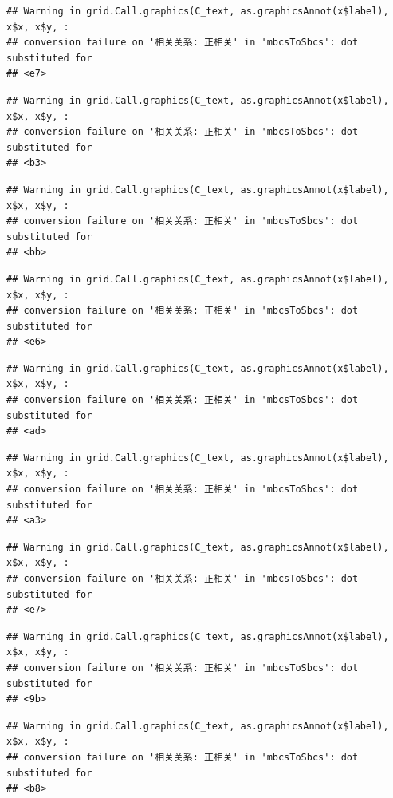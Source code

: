 \documentclass[
]{book}
\begin{document}
\begin{verbatim}
## Warning in grid.Call.graphics(C_text, as.graphicsAnnot(x$label), x$x, x$y, :
## conversion failure on '相关关系: 正相关' in 'mbcsToSbcs': dot substituted for
## <e7>
\end{verbatim}

\begin{verbatim}
## Warning in grid.Call.graphics(C_text, as.graphicsAnnot(x$label), x$x, x$y, :
## conversion failure on '相关关系: 正相关' in 'mbcsToSbcs': dot substituted for
## <b3>
\end{verbatim}

\begin{verbatim}
## Warning in grid.Call.graphics(C_text, as.graphicsAnnot(x$label), x$x, x$y, :
## conversion failure on '相关关系: 正相关' in 'mbcsToSbcs': dot substituted for
## <bb>
\end{verbatim}

\begin{verbatim}
## Warning in grid.Call.graphics(C_text, as.graphicsAnnot(x$label), x$x, x$y, :
## conversion failure on '相关关系: 正相关' in 'mbcsToSbcs': dot substituted for
## <e6>
\end{verbatim}

\begin{verbatim}
## Warning in grid.Call.graphics(C_text, as.graphicsAnnot(x$label), x$x, x$y, :
## conversion failure on '相关关系: 正相关' in 'mbcsToSbcs': dot substituted for
## <ad>
\end{verbatim}

\begin{verbatim}
## Warning in grid.Call.graphics(C_text, as.graphicsAnnot(x$label), x$x, x$y, :
## conversion failure on '相关关系: 正相关' in 'mbcsToSbcs': dot substituted for
## <a3>
\end{verbatim}

\begin{verbatim}
## Warning in grid.Call.graphics(C_text, as.graphicsAnnot(x$label), x$x, x$y, :
## conversion failure on '相关关系: 正相关' in 'mbcsToSbcs': dot substituted for
## <e7>
\end{verbatim}

\begin{verbatim}
## Warning in grid.Call.graphics(C_text, as.graphicsAnnot(x$label), x$x, x$y, :
## conversion failure on '相关关系: 正相关' in 'mbcsToSbcs': dot substituted for
## <9b>
\end{verbatim}

\begin{verbatim}
## Warning in grid.Call.graphics(C_text, as.graphicsAnnot(x$label), x$x, x$y, :
## conversion failure on '相关关系: 正相关' in 'mbcsToSbcs': dot substituted for
## <b8>
\end{verbatim}
\end{document}
